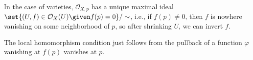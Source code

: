 In the case of varieties, $\mathcal{O}_{X, p}$ has a unique maximal ideal
$\set{(U, f) \in \mathcal{O}_X(U)\given f(p) = 0}/\sim$, i.e., if $f(p)\neq 0$,
then $f$ is nowhere vanishing on some neighborhood of $p$, so after shrinking
$U$, we can invert $f$.

The local homomorphism condition just follows from the pullback of a function
$\varphi$ vanishing at $f(p)$ vanishes at $p$.
